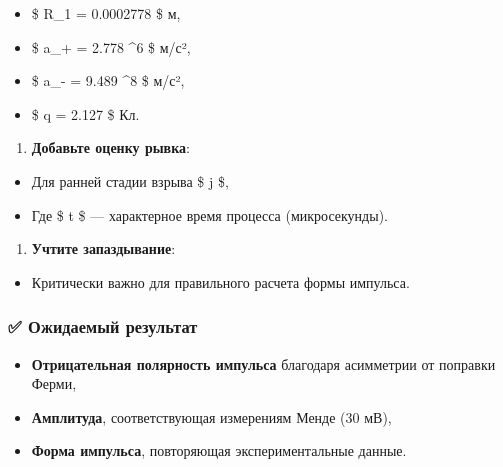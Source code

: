 \documentclass[11pt]{article}
\providecommand{\tightlist}{%
      \setlength{\itemsep}{0pt}\setlength{\parskip}{0pt}}
\begin{document}
\begin{itemize}
\tightlist
\item
  \$ R\_1 = 0.0002778 \$ м,\\
\item
  \$ a\_+ = 2.778 \^{}6 \$ м/с²,\\
\item
  \$ a\_- = 9.489 \^{}8 \$ м/с²,\\
\item
  \$ q = 2.127 \$ Кл.
\end{itemize}

\begin{enumerate}
\def\labelenumi{\arabic{enumi}.}
\setcounter{enumi}{1}
\tightlist
\item
  \textbf{Добавьте оценку рывка}:\\
\end{enumerate}

\begin{itemize}
\tightlist
\item
  Для ранней стадии взрыва \$ j \approx {} \$,\\
\item
  Где \$ \Delta t \$ --- характерное время процесса (микросекунды).
\end{itemize}

\begin{enumerate}
\def\labelenumi{\arabic{enumi}.}
\setcounter{enumi}{2}
\tightlist
\item
  \textbf{Учтите запаздывание}:\\
\end{enumerate}

\begin{itemize}
\tightlist
\item
  Критически важно для правильного расчета формы импульса.
\end{itemize}

\subsubsection{✅ Ожидаемый
результат}\label{ux43eux436ux438ux434ux430ux435ux43cux44bux439-ux440ux435ux437ux443ux43bux44cux442ux430ux442-2}

\begin{itemize}
\tightlist
\item
  \textbf{Отрицательная полярность импульса} благодаря асимметрии от
  поправки Ферми,
\item
  \textbf{Амплитуда}, соответствующая измерениям Менде (30 мВ),
\item
  \textbf{Форма импульса}, повторяющая экспериментальные данные.
\end{itemize}
\end{document}
